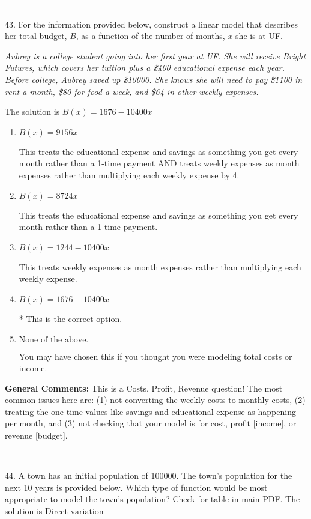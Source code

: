 \documentclass{article}[14pt]
\begin{document}
-----------------------------------------------

43. For the information provided below, construct a linear model that describes her total budget, $B$, as a function of the number of months, $x$ she is at UF.
\begin{center} \textit{Aubrey is a college student going into her first year at UF. She will receive Bright Futures, which covers her tuition plus a \$400 educational expense each year. Before college, Aubrey saved up \$10000. She knows she will need to pay \$1100 in rent a month, \$80 for food a week, and \$64 in other weekly expenses.} \end{center} 
The solution is $ B(x) = 1676 - 10400 x $ 

\begin{enumerate}[label=\Alph*.] 
\item $ B(x) = 9156 x $ 

 This treats the educational expense and savings as something you get every month rather than a 1-time payment AND treats weekly expenses as month expenses rather than multiplying each weekly expense by 4. 
\item $ B(x) = 8724 x $ 

 This treats the educational expense and savings as something you get every month rather than a 1-time payment. 
\item $ B(x) = 1244 - 10400 x $ 

 This treats weekly expenses as month expenses rather than multiplying each weekly expense. 
\item $ B(x) = 1676 - 10400 x $ 

 * This is the correct option. 
\item $ \text{None of the above.} $ 

 You may have chosen this if you thought you were modeling total costs or income. 
\end{enumerate} 
 
\textbf{General Comments:} This is a Costs, Profit, Revenue question! The most common issues here are: (1) not converting the weekly costs to monthly costs, (2) treating the one-time values like savings and educational expense as happening per month, and (3) not checking that your model is for cost, profit [income], or revenue [budget].

-----------------------------------------------

44. A town has an initial population of 100000. The town's population for the next 10 years is provided below. Which type of function would be most appropriate to model the town's population?
Check for table in main PDF. 
The solution is $ \text{Direct variation} $ 
\end{document}
